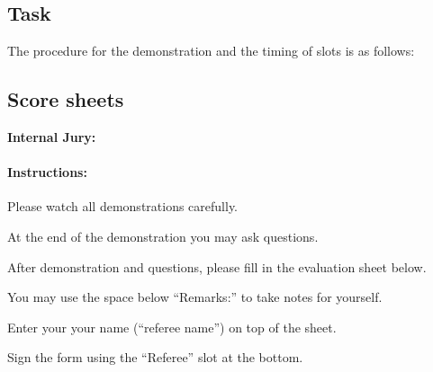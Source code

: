 

\subsection{Task}
The procedure for the demonstration and the timing of slots is as follows:

\OpenDemonstrationChanges








\subsection{Score sheets}

\clearpage
\begin{center}
\textbf{Internal Jury:}
\end{center} 

\paragraph{Instructions:}
\begin{compactenum}
\item Please watch all demonstrations carefully.
\item At the end of the demonstration you may ask questions.
\item After demonstration and questions, please fill in the evaluation sheet below.
\item You may use the space below \enquote{Remarks:} to take notes for yourself.
\item Enter your your name (\enquote{referee name}) on top of the sheet.
\item Sign the form using the \enquote{Referee} slot at the bottom.
\end{compactenum}

